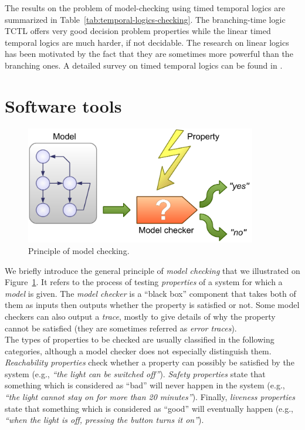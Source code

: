 The results on the problem of model-checking using timed temporal logics are summarized in Table~\ref{tab:temporal-logics-checking}. The branching-time logic TCTL offers very good decision problem properties while the linear timed temporal logics are much harder, if not decidable. The research on linear logics has been motivated by the fact that they are sometimes more powerful than the branching ones. A detailed survey on timed temporal logics can be found in \cite{Bouyer-M4M5}.


\section{Software tools}


\begin{figure}[htbp]
    \centering
    \includegraphics[width=0.9\textwidth]{content/timed-automata/model-checking}
    \caption{Principle of model checking.}
    \label{fig:model-checking}
\end{figure}

We briefly introduce the general principle of \emph{model checking} that we illustrated on Figure~\ref{fig:model-checking}. It refers to the process of testing \emph{properties} of a system for which a \emph{model} is given. The \emph{model checker} is a ``black box'' component that takes both of them as inputs then outputs whether the property is satisfied or not. Some model checkers can also output a \emph{trace}, mostly to give details of why the property cannot be satisfied (they are sometimes referred as \emph{error traces}).\\

The types of properties to be checked are usually classified in the following categories, although a model checker does not especially distinguish them. \emph{Reachability properties} check whether a property can possibly be satisfied by the system (e.g., \emph{``the light can be switched off''}). \emph{Safety properties} state that something which is considered as ``bad'' will never happen in the system (e.g., \emph{``the light cannot stay on for more than 20 minutes''}). Finally, \emph{liveness properties} state that something which is considered as ``good'' will eventually happen (e.g., \emph{``when the light is off, pressing the button turns it on''}).\\

